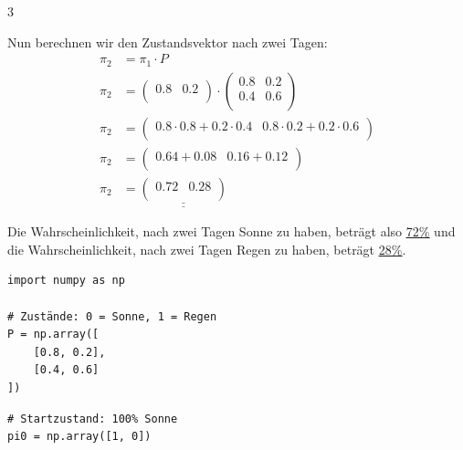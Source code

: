 \begin{landscape}
\begin{multicols*}{3}
\begin{cheatSheetBox}[title=Vorhersage von Zuständen]
			Nun berechnen wir den Zustandsvektor nach zwei Tagen:
			\[\begin{aligned}
					\pi_2 & = \pi_1 \cdot P                                       \\
					\pi_2 & =
					\begin{pmatrix}
						0.8 & 0.2 \\
					\end{pmatrix}
					\cdot
					\begin{pmatrix}
						0.8 & 0.2 \\
						0.4 & 0.6 \\
					\end{pmatrix}                                                \\
					\pi_2 & =
					\begin{pmatrix}
						0.8 \cdot 0.8 + 0.2 \cdot 0.4 & 0.8 \cdot 0.2 + 0.2 \cdot 0.6 \\
					\end{pmatrix} \\
					\pi_2 & =
					\begin{pmatrix}
						0.64 + 0.08 & 0.16 + 0.12 \\
					\end{pmatrix}                                     \\
					\pi_2 & =
					\underline{\underline{
							\begin{pmatrix}
								0.72 & 0.28 \\
							\end{pmatrix}
						}}
				\end{aligned}\]

			Die Wahrscheinlichkeit, nach zwei Tagen Sonne zu haben, beträgt also \underline{\underline{72\%}} und die Wahrscheinlichkeit, nach zwei Tagen Regen zu haben, beträgt \underline{\underline{28\%}}.
		\end{cheatSheetBox}

		\begin{cheatSheetBox}[title=Python: Erstellung der Übergangsmatrix]
			\begin{lstlisting}
import numpy as np

# Zustände: 0 = Sonne, 1 = Regen
P = np.array([
    [0.8, 0.2],
    [0.4, 0.6]
])
\end{lstlisting}
		\end{cheatSheetBox}
		\begin{cheatSheetBox}[title=Python: Vorhersage von Zuständen]
			\begin{lstlisting}
# Startzustand: 100% Sonne
pi0 = np.array([1, 0])


\end{lstlisting}
\end{cheatSheetBox}
\end{multicols*}
\end{landscape}
